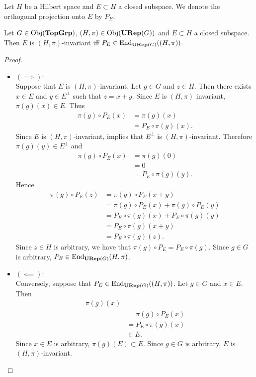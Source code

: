 \documentclass{book}
\begin{document}
	\begin{note}
		Let $H$ be a Hilbert space and $E \subset H$ a closed subspace. We denote the orthogonal projection onto $E$ by $P_E$.
	\end{note}
	
	\begin{ex}
		Let $G \in \operatorname{Obj}(\operatorname*{\text{\textbf{TopGrp}}})$, $(H, \pi) \in \operatorname{Obj}(\operatorname*{\text{\textbf{URep}}}(G))$ and $E \subset H$ a closed subspace. Then $E$ is $(H, \pi)$-invariant iff $P_E \in \operatorname{\text{End}}_{\operatorname*{\text{\textbf{URep}}}(G)}((H, \pi))$.
	\end{ex}
	
	\begin{proof}\
		\begin{itemize}
			\item $(\implies):$ \\
			Suppose that $E$ is $(H, \pi)$-invariant. Let $g \in G$ and $z \in H$. Then there exists $x \in E$ and $y \in E^{\perp}$ such that $z = x+y$. Since $E$ is $(H, \pi)$ invariant, $\pi(g)(x) \in E$. Thus 
			\begin{align*}
				\pi(g) \circ P_E (x) 
				& = \pi(g)(x) \\
				& = P_E \circ \pi(g)(x).
			\end{align*} 
			Since $E$ is $(H, \pi)$-invariant,  implies that $E^{\perp}$ is $(H, \pi)$-invariant. Therefore $\pi(g)(y) \in E^{\perp}$ and
			\begin{align*}
				\pi(g) \circ P_E (x) 
				& = \pi(g)(0) \\
				& = 0 \\
				& = P_E \circ \pi(g)(y).
			\end{align*}
			Hence 
			\begin{align*}
				\pi(g) \circ P_E (z)
				& = \pi(g) \circ P_E (x + y) \\
				& = \pi(g) \circ P_E (x) + \pi(g) \circ P_E(y) \\
				& = P_E \circ \pi(g)(x) + P_E \circ \pi(g)(y) \\
				& = P_E \circ \pi(g)(x + y) \\
				& = P_E \circ \pi(g)(z).
			\end{align*}
			Since $z \in H$ is arbitrary, we have that $\pi(g) \circ P_E = P_E \circ \pi(g)$. Since $g \in G$ is arbitrary, $P_E \in \operatorname{\text{End}}_{\operatorname*{\text{\textbf{URep}}}(G)}(H, \pi)$. 
			\item $(\impliedby):$ \\
			Conversely, suppose that $P_E \in \operatorname{\text{End}}_{\operatorname*{\text{\textbf{URep}}}(G)}((H, \pi))$. Let $g \in G$ and $x \in E$. Then 
			\begin{align*}
				\pi(g)(x) \\
				& = \pi(g) \circ P_E (x) \\
				& = P_E \circ \pi(g) (x) \\
				& \in E.	
			\end{align*}
			Since $x \in E$ is arbitrary, $\pi(g)(E) \subset E$. Since $g \in G$ is arbitrary, $E$ is $(H, \pi)$-invariant. 
		\end{itemize}
	\end{proof}
	
\end{document}
